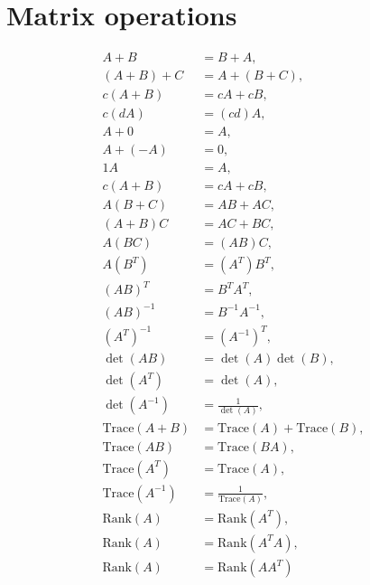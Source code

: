 \documentclass{article}
\begin{document}
\section{Matrix operations}
\begin{align*}
    A+B &= B+A, \\
    (A+B)+C &= A+(B+C), \\
    c(A+B) &= cA+cB, \\
    c(dA) &= (cd)A, \\
    A+0 &= A, \\
    A+(-A) &= 0, \\
    1A &= A, \\
    c(A+B) &= cA+cB, \\
    A(B+C) &= AB+AC, \\
    (A+B)C &= AC+BC, \\
    A(BC) &= (AB)C, \\
    A(B^T) &= (A^T)B^T, \\
    (AB)^T &= B^TA^T, \\
    (AB)^{-1} &= B^{-1}A^{-1}, \\
    (A^T)^{-1} &= (A^{-1})^T, \\
    \det(AB) &= \det(A)\det(B), \\
    \det(A^T) &= \det(A), \\
    \det(A^{-1}) &= \frac{1}{\det(A)}, \\
    \text{Trace}(A+B) &= \text{Trace}(A) + \text{Trace}(B), \\
    \text{Trace}(AB) &= \text{Trace}(BA), \\
    \text{Trace}(A^T) &= \text{Trace}(A), \\
    \text{Trace}(A^{-1}) &= \frac{1}{\text{Trace}(A)}, \\
    \text{Rank}(A) &= \text{Rank}(A^T), \\
    \text{Rank}(A) &= \text{Rank}(A^TA), \\
    \text{Rank}(A) &= \text{Rank}(AA^T)
\end{align*}
\end{document}
